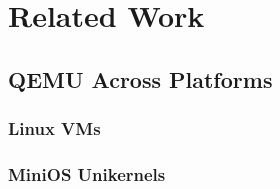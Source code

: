 \chapter{Related Work}
\label{chapter:related-work}

\section{QEMU Across Platforms}
\label{sec:qemu-across-platforms}


\subsection{Linux VMs}
\label{subsec:linux-vms}

\subsection{MiniOS Unikernels}
\label{subsec:minios-unikernels}
